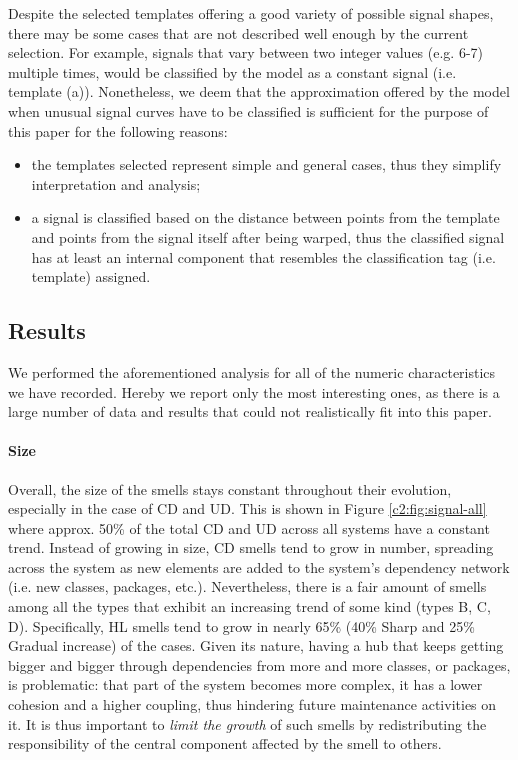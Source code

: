Despite the selected templates offering a good variety of possible signal shapes, there may be some cases that are not described well enough by the current selection. For example, signals that vary between two integer values (e.g. 6-7) multiple times, would be classified by the model as a constant signal (i.e. template (a)).
Nonetheless, we deem that the approximation offered by the model when unusual signal curves have to be classified is sufficient for the purpose of this paper for the following reasons:
\begin{itemize}
    \item the templates selected represent simple and general cases, thus they simplify interpretation and analysis;
    \item a signal is classified based on the distance between points from the template and points from the signal itself after being warped, thus the classified signal has at least an internal component that resembles the classification tag (i.e. template) assigned.
\end{itemize}

\subsection{Results}
We performed the aforementioned analysis for all of the numeric characteristics we have recorded.
Hereby we report only the most interesting ones, as there is a large number of data and results that could not realistically fit into this paper.
\paragraph{Size}
Overall, the size of the smells stays constant throughout their evolution, especially in the case of CD and UD. This is shown in Figure \ref{c2:fig:signal-all} where approx. 50\% of the total CD and UD across all systems have a constant trend.
Instead of growing in size, CD smells tend to grow in number, spreading across the system as new elements are added to the system's dependency network (i.e. new classes, packages, etc.).
Nevertheless, there is a fair amount of smells among all the types that exhibit an increasing trend of some kind (types B, C, D).
Specifically, HL smells tend to grow in nearly 65\% (40\% Sharp and 25\% Gradual increase) of the cases. Given its nature, having a hub that keeps getting bigger and bigger through dependencies from more and more classes, or packages, is problematic: that part of the system becomes more complex, it has a lower cohesion and a higher coupling, thus hindering future maintenance activities on it.
It is thus important to \emph{limit the growth} of such smells by redistributing the responsibility of the central component affected by the smell to others.

